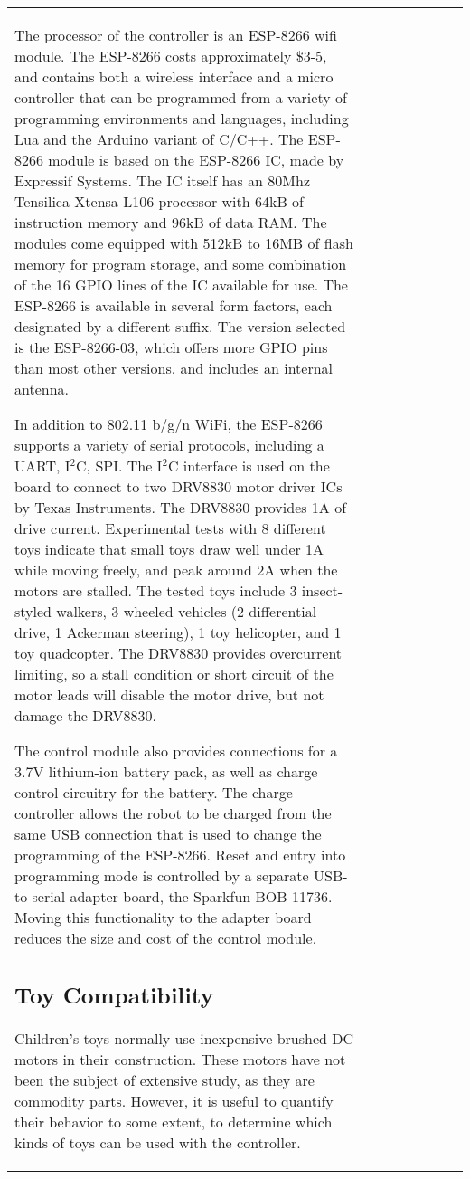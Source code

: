 \begin{tabular}{l l l l l l l l }
The processor of the controller is an ESP-8266 wifi module.
The ESP-8266 costs approximately \$3-5, and contains both a wireless interface and a micro controller that can be programmed from a variety of programming environments and languages, including Lua and the Arduino variant of C/C++. The ESP-8266 module is based on the ESP-8266 IC, made by Expressif Systems. The IC itself has an 80Mhz Tensilica Xtensa L106 processor with 64kB of instruction memory and 96kB of data RAM. The modules come equipped with 512kB to 16MB of flash memory for program storage, and some combination of the 16 GPIO lines of the IC available for use. 
The ESP-8266 is available in several form factors, each designated by a different suffix. 
The version selected is the ESP-8266-03, which offers more GPIO pins than most other versions, and includes an internal antenna.

In addition to 802.11 b/g/n WiFi, the ESP-8266 supports a variety of serial protocols, including a UART, I$^2$C, SPI. 
The I$^2$C interface is used on the board to connect to two DRV8830 motor driver ICs by Texas Instruments. 
The DRV8830 provides 1A of drive current.
Experimental tests with 8 different toys indicate that small toys draw well under 1A while moving freely, and peak around 2A when the motors are stalled. 
The tested toys include 3 insect-styled walkers, 3 wheeled vehicles (2 differential drive, 1 Ackerman steering), 1 toy helicopter, and 1 toy quadcopter.
The DRV8830 provides overcurrent limiting, so a stall condition or short circuit of the motor leads will disable the motor drive, but not damage the DRV8830. 

The control module also provides connections for a 3.7V lithium-ion battery pack, as well as charge control circuitry for the battery. 
The charge controller allows the robot to be charged from the same USB connection that is used to change the programming of the ESP-8266. 
Reset and entry into programming mode is controlled by a separate USB-to-serial adapter board, the Sparkfun BOB-11736.
Moving this functionality to the adapter board reduces the size and cost of the control module. 

\subsection{Toy Compatibility}

Children's toys normally use inexpensive brushed DC motors in their construction. 
These motors have not been the subject of extensive study, as they are commodity parts. 
However, it is useful to quantify their behavior to some extent, to determine which kinds of toys can be used with the controller. 


\end{tabular}
